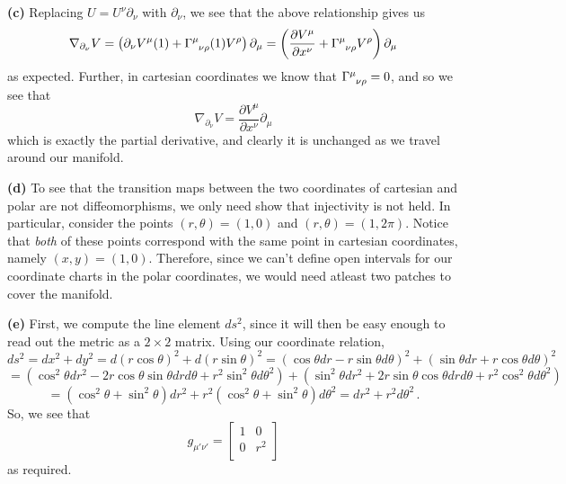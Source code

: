 \documentclass[10pt]{article}
\begin{document}
\textbf{(c)} Replacing $U = U^{\nu}\partial_{\nu}$ with $\partial_{\nu}$, we see that the above relationship gives us
\[ \nabla_{\partial_{\nu}}V = \left(\partial_{\nu}V^{\mu}(1) + \tensor{\Gamma}{^{\mu}_{\nu\rho}}(1)V^{\rho}\right)\partial_{\mu} = \left(\frac{\partial V^{\mu}}{\partial x^{\nu}} + \tensor{\Gamma}{^{\mu}_{\nu\rho}}V^{\rho}\right)\partial_{\mu}\]
as expected. Further, in cartesian coordinates we know that $\tensor{\Gamma}{^{\mu}_{\nu\rho}} = 0$, and so we see that
\[ \nabla_{\partial_{\nu}}V = \frac{\partial V^{\mu}}{\partial x^{\nu}}\partial_{\mu} \]
which is exactly the partial derivative, and clearly it is unchanged as we travel around our manifold.

\textbf{(d)} To see that the transition maps between the two coordinates of cartesian and polar are not diffeomorphisms, we only need show that injectivity is not held. In particular, consider the points $(r,\theta) = (1, 0)$ and $(r,\theta) = (1,2\pi)$. Notice that \textit{both} of these points correspond with the same point in cartesian coordinates, namely $(x,y) = (1,0)$. Therefore, since we can't define open intervals for our coordinate charts in the polar coordinates, we would need atleast two patches to cover the manifold.

\textbf{(e)} First, we compute the line element $ds^{2}$, since it will then be easy enough to read out the metric as a $2\times 2$ matrix. Using our coordinate relation,
\[ ds^{2} = dx^{2} + dy^{2} = d(r\cos\theta)^{2} + d(r\sin\theta)^{2} = \left(\cos\theta dr - r\sin\theta d\theta\right)^{2} + \left(\sin\theta dr + r\cos\theta d\theta\right)^{2}\]
\[= \left(\cos^{2}\theta dr^{2} - 2r\cos\theta\sin\theta drd\theta + r^{2}\sin^{2}\theta d\theta^{2}\right) + \left(\sin^{2}\theta dr^{2} + 2r\sin\theta\cos\theta drd\theta + r^{2}\cos^{2}\theta d\theta^{2}\right) \]
\[ = \left(\cos^{2}\theta + \sin^{2}\theta\right)dr^{2} + r^{2}\left(\cos^{2}\theta + \sin^{2}\theta\right)d\theta^{2} = dr^{2} + r^{2}d\theta^{2} \, .\]
So, we see that
\[ g_{\mu'\nu'} =
\begin{bmatrix}
  1 & 0 \\
  0 & r^{2} \\
\end{bmatrix}
\]
as required.
\end{document}
